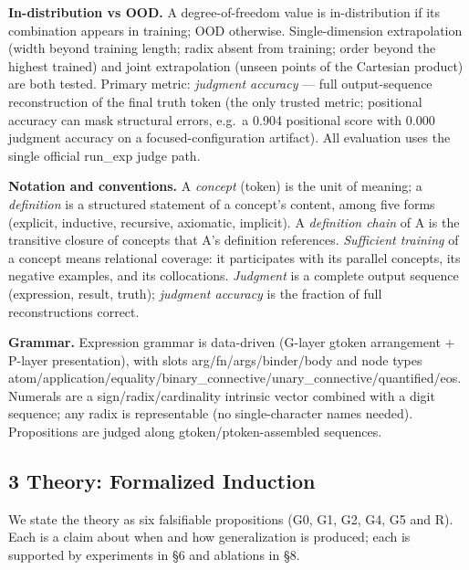 \documentclass[
]{article}
\begin{document}
\textbf{In-distribution vs OOD.} A degree-of-freedom value is
in-distribution if its combination appears in training; OOD otherwise.
Single-dimension extrapolation (width beyond training length; radix
absent from training; order beyond the highest trained) and joint
extrapolation (unseen points of the Cartesian product) are both tested.
Primary metric: \emph{judgment accuracy} --- full output-sequence
reconstruction of the final truth token (the only trusted metric;
positional accuracy can mask structural errors, e.g.~a 0.904 positional
score with 0.000 judgment accuracy on a focused-configuration artifact).
All evaluation uses the single official run\_exp judge path.

\textbf{Notation and conventions.} A \emph{concept} (token) is the unit
of meaning; a \emph{definition} is a structured statement of a concept's
content, among five forms (explicit, inductive, recursive, axiomatic,
implicit). A \emph{definition chain} of A is the transitive closure of
concepts that A's definition references. \emph{Sufficient training} of a
concept means relational coverage: it participates with its parallel
concepts, its negative examples, and its collocations. \emph{Judgment}
is a complete output sequence (expression, result, truth);
\emph{judgment accuracy} is the fraction of full reconstructions
correct.

\textbf{Grammar.} Expression grammar is data-driven (G-layer gtoken
arrangement + P-layer presentation), with slots arg/fn/args/binder/body
and node types
atom/application/equality/binary\_connective/unary\_connective/quantified/eos.
Numerals are a sign/radix/cardinality intrinsic vector combined with a
digit sequence; any radix is representable (no single-character names
needed). Propositions are judged along gtoken/ptoken-assembled
sequences.

\subsection{3 Theory: Formalized
Induction}\label{theory-formalized-induction}

We state the theory as six falsifiable propositions (G0, G1, G2, G4, G5
and R). Each is a claim about when and how generalization is produced;
each is supported by experiments in §6 and ablations in §8.
\end{document}
